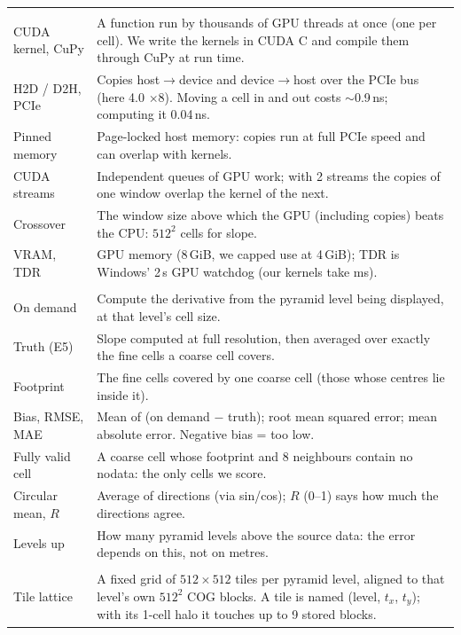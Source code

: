 ﻿\documentclass[11pt,a4paper]{article}
\begin{document}
\begin{longtable}{>{\raggedright\arraybackslash}p{3.4cm}>{\raggedright\arraybackslash}p{12.0cm}}
\midrule
\multicolumn{2}{l}{\textit{Our engine (GPU)}} \\
CUDA kernel, CuPy & A function run by thousands of GPU threads at once (one per cell). We write the kernels in CUDA C
and compile them through CuPy at run time. \\
H2D / D2H, PCIe & Copies host$\to$device and device$\to$host over the PCIe bus (here 4.0 $\times$8). Moving a cell in and
out costs $\sim$0.9\,ns; computing it 0.04\,ns. \\
Pinned memory & Page-locked host memory: copies run at full PCIe speed and can overlap with kernels. \\
CUDA streams & Independent queues of GPU work; with 2 streams the copies of one window overlap the kernel of the next. \\
Crossover & The window size above which the GPU (including copies) beats the CPU: $512^2$ cells for slope. \\
VRAM, TDR & GPU memory (8\,GiB, we capped use at 4\,GiB); TDR is Windows' 2\,s GPU watchdog (our kernels take ms). \\
\midrule
\multicolumn{2}{l}{\textit{Phase 4 (pyramid)}} \\
On demand & Compute the derivative from the pyramid level being displayed, at that level's cell size. \\
Truth (E5) & Slope computed at full resolution, then averaged over exactly the fine cells a coarse cell covers. \\
Footprint & The fine cells covered by one coarse cell (those whose centres lie inside it). \\
Bias, RMSE, MAE & Mean of (on demand $-$ truth); root mean squared error; mean absolute error. Negative bias = too low. \\
Fully valid cell & A coarse cell whose footprint and 8 neighbours contain no nodata: the only cells we score. \\
Circular mean, $R$ & Average of directions (via sin/cos); $R$ (0--1) says how much the directions agree. \\
Levels up & How many pyramid levels above the source data: the error depends on this, not on metres. \\
\midrule
\multicolumn{2}{l}{\textit{Phase 5: the tile server}} \\
Tile lattice & A fixed grid of $512\times512$ tiles per pyramid level, aligned to that level's own $512^2$ COG blocks.
A tile is named (level, $t_x$, $t_y$); with its 1-cell halo it touches up to 9 stored blocks. \\

\end{longtable}
\end{document}
